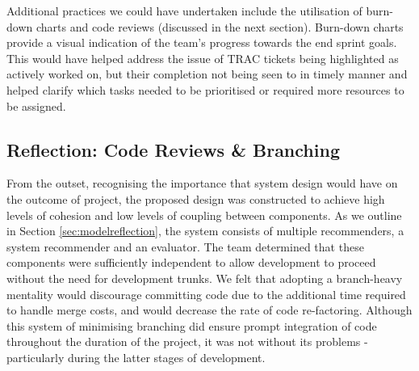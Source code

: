 \documentclass{l3proj}
\begin{document}
Additional practices we could have undertaken include the utilisation of burn-down charts and code reviews (discussed in the next section). Burn-down charts provide a visual indication of the team’s progress towards the end sprint goals. This would have helped address the issue of TRAC tickets being highlighted as actively worked on, but their completion not being seen to in timely manner and helped clarify which tasks needed to be prioritised or required more resources to be assigned. 


\subsection{Reflection: Code Reviews \& Branching}
\label{sec:codereviewbranch}





From the outset, recognising the importance that system design would have on the outcome of project, the proposed design was constructed to achieve high levels of cohesion and low levels of coupling between components. As we outline in Section \ref{sec:modelreflection}, the system consists of multiple recommenders, a system recommender and an evaluator. The team determined that these components were sufficiently independent to allow development to proceed without the need for development trunks. We felt that adopting a branch-heavy mentality would discourage committing code due to the additional time required to handle merge costs, and would decrease the rate of code re-factoring. Although this system of minimising branching did ensure prompt integration of code throughout the duration of the project, it was not without its problems - particularly during the latter stages of development.
\end{document}

